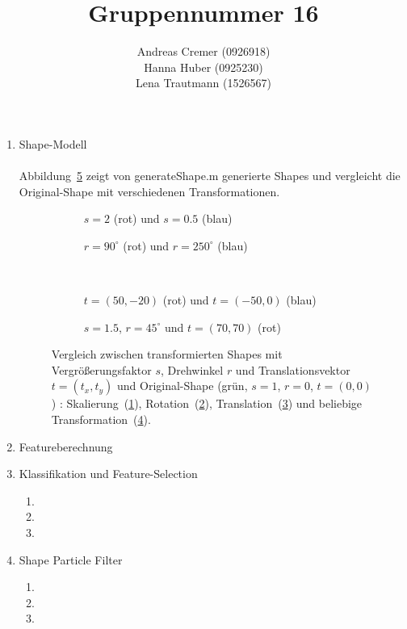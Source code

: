 \documentclass[]{report}
\title{Gruppennummer 16}
\author{Andreas Cremer (0926918)\\Hanna Huber (0925230) \\Lena Trautmann (1526567)}
\newlength\figureheight
\newlength\figurewidth
\begin{document}
	\maketitle
	
	
	\begin{enumerate}
		\item Shape-Modell \\\\
			Abbildung~\ref{fig:trafo} zeigt von generateShape.m generierte Shapes und vergleicht die Original-Shape mit verschiedenen Transformationen.
			\setlength\figureheight{3.5cm}
			\setlength{}
			\begin{figure}
				\begin{subfigure}{0.45\textwidth}
					\centering
					
					\caption{$s=2$ (rot) und $s=0.5$ (blau)}
					\label{fig:s}
				\end{subfigure}
				\qquad
				\begin{subfigure}{0.45\textwidth}
					\centering
					
					\caption{$r=90^\circ$ (rot) und $r=250^\circ$  (blau)}
					\label{fig:r}
				\end{subfigure}	
				\\
				\begin{subfigure}{0.45\textwidth}
					\centering
					
					\caption{$t=(50,-20)$ (rot) und $t=(-50,0)$ (blau)}
					\label{fig:t}
				\end{subfigure}
				\qquad
				\begin{subfigure}{0.45\textwidth}
					\centering
					
					\caption{$s=1.5$, $r=45^\circ$ und $t=(70,70)$ (rot)}
					\label{fig:mix}
				\end{subfigure}	
				\caption{Vergleich zwischen transformierten Shapes mit Vergrößerungsfaktor $s$, Drehwinkel $r$ und Translationsvektor $t=(t_x,t_y)$ und Original-Shape (grün, $s=1$, $r=0$, $t=(0,0)$) : Skalierung~(\ref{fig:s}), Rotation~(\ref{fig:r}), Translation~(\ref{fig:t}) und beliebige Transformation~(\ref{fig:mix}).}
				\label{fig:trafo}
			\end{figure}
			

		\item Featureberechnung
			
		\item Klassifikation und Feature-Selection
			\begin{enumerate}
				\item
				\item
				\item 
			\end{enumerate}
		
		\item Shape Particle Filter
			\begin{enumerate}
				\item
				\item
				\item
			\end{enumerate}
			
	\end{enumerate}
	
\end{document}

